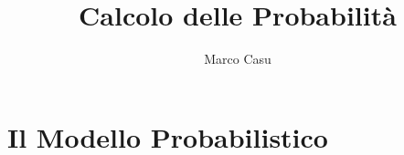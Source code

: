 \documentclass[12pt, letterpaper]{article}
\title{Calcolo delle Probabilità}
\author{Marco Casu}
\date{\vspace{-5ex}}
\begin{document}
\maketitle
\begin{figure}[h]
\end{figure}
\newpage
\tableofcontents
\newpage
\section{Il Modello Probabilistico}
\end{document}
